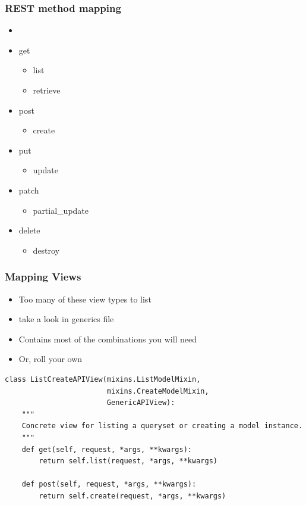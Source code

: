 \documentclass{beamer}
\begin{document}
\begin{frame}[fragile]

  \frametitle{REST method mapping}

  \begin{itemize}
  	\item 
      	\item get
		\begin{itemize}
    			\item list
    			\item retrieve
    		\end{itemize}
      	\item post
		\begin{itemize}
    			\item create
    		\end{itemize}
      	\item put
		\begin{itemize}
    			\item update
    		\end{itemize}
      	\item patch
		\begin{itemize}
    			\item partial\_update
    		\end{itemize}
      	\item delete
		\begin{itemize}
    			\item destroy
    		\end{itemize}
  \end{itemize}
  
\end{frame}

\begin{frame}[fragile]

  \frametitle{Mapping Views}

  \begin{itemize}
  	\item Too many of these view types to list 
	\item take a look in generics file
	\item Contains most of the combinations you will need
	\item Or, roll your own
  \end{itemize}
 
\begin{lstlisting}
class ListCreateAPIView(mixins.ListModelMixin,
                        mixins.CreateModelMixin,
                        GenericAPIView):
    """
    Concrete view for listing a queryset or creating a model instance.
    """
    def get(self, request, *args, **kwargs):
        return self.list(request, *args, **kwargs)

    def post(self, request, *args, **kwargs):
        return self.create(request, *args, **kwargs)

\end{lstlisting}
  
\end{frame}
\end{document}
